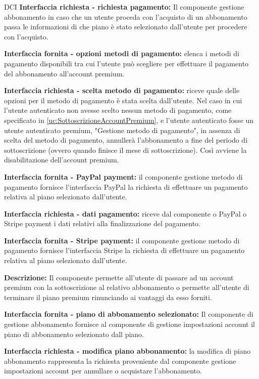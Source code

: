 \begin{listaPersonale}{DCI}
    \textbf{Interfaccia richiesta - richiesta pagamento:} Il componente gestione abbonamento in caso che un utente proceda con l'acquisto di un abbonamento passa le informazioni di che piano è stato selezionato dall'utente per procedere con l'acquisto.

    \textbf{Interfaccia fornita - opzioni metodi di pagamento:} elenca i metodi di pagamento disponibili tra cui l'utente può scegliere per effettuare il pagamento del abbonamento all'account premium.

    \textbf{Interfaccia richiesta - scelta metodo di pagamento:} riceve quale delle opzioni per il metodo di pagamento è stata scelta dall'utente. Nel caso in cui l'utente autenticato non avesse scelto nessun metodo di pagamento, come specificato in \ref{uc:SottoscrizioneAccountPremium}, e l'utente autenticato fosse un utente autenticato premium, "Gestione metodo di pagamento", in assenza di scelta del metodo di pagamento, annullerà l'abbonamento a fine del periodo di sottoscrizione (ovvero quando finisce il mese di sottoscrizione). Così avviene la disabilitazione dell'account premium.

    \textbf{Interfaccia fornita - PayPal payment:} il componente gestione metodo di pagamento fornisce l'interfaccia PayPal la richiesta di effettuare un pagamento relativa al piano selezionato dall'utente.

    \textbf{Interfaccia richiesta - dati pagamento:} riceve dal componente o PayPal o Stripe payment i dati relativi alla finalizzazione del pagamento.

    \textbf{Interfaccia fornita - Stripe payment:}  il componente gestione metodo di pagamento fornisce l'interfaccia Stripe la richiesta di effettuare un pagamento relativa al piano selezionato dall'utente.



    \textbf{Descrizione:} Il componente permette all'utente di passare ad un account premium con la sottoscrizione al relativo abbonamento o permette all'utente di terminare il piano premium rinunciando ai vantaggi da esso forniti.

    \textbf{Interfaccia fornita - piano di abbonamento selezionato:} Il componente di gestione abbonamento fornisce al componente di gestione impostazioni account il piano di abbonamento selezionato dall piano.

    \textbf{Interfaccia richiesta - modifica piano abbonamento:} la modifica di piano abbonamento rappresenta la richiesta proveniente dal componente gestione impostazioni account per annullare o acquistare l'abbonamento.


\end{listaPersonale}

